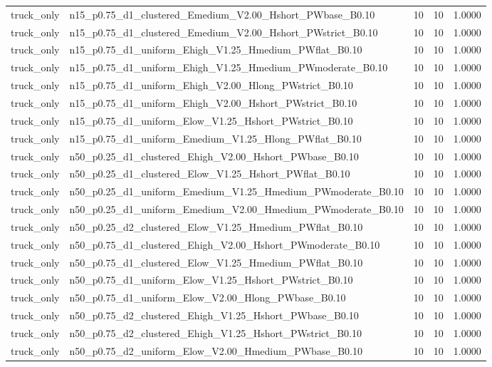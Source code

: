 \begin{tabular}{llrrr}
truck_only & n15_p0.75_d1_clustered_Emedium_V2.00_Hshort_PWbase_B0.10 & 10 & 10 & 1.0000 \\
truck_only & n15_p0.75_d1_clustered_Emedium_V2.00_Hshort_PWstrict_B0.10 & 10 & 10 & 1.0000 \\
truck_only & n15_p0.75_d1_uniform_Ehigh_V1.25_Hmedium_PWflat_B0.10 & 10 & 10 & 1.0000 \\
truck_only & n15_p0.75_d1_uniform_Ehigh_V1.25_Hmedium_PWmoderate_B0.10 & 10 & 10 & 1.0000 \\
truck_only & n15_p0.75_d1_uniform_Ehigh_V2.00_Hlong_PWstrict_B0.10 & 10 & 10 & 1.0000 \\
truck_only & n15_p0.75_d1_uniform_Ehigh_V2.00_Hshort_PWstrict_B0.10 & 10 & 10 & 1.0000 \\
truck_only & n15_p0.75_d1_uniform_Elow_V1.25_Hshort_PWstrict_B0.10 & 10 & 10 & 1.0000 \\
truck_only & n15_p0.75_d1_uniform_Emedium_V1.25_Hlong_PWflat_B0.10 & 10 & 10 & 1.0000 \\
truck_only & n50_p0.25_d1_clustered_Ehigh_V2.00_Hshort_PWbase_B0.10 & 10 & 10 & 1.0000 \\
truck_only & n50_p0.25_d1_clustered_Elow_V1.25_Hshort_PWflat_B0.10 & 10 & 10 & 1.0000 \\
truck_only & n50_p0.25_d1_uniform_Emedium_V1.25_Hmedium_PWmoderate_B0.10 & 10 & 10 & 1.0000 \\
truck_only & n50_p0.25_d1_uniform_Emedium_V2.00_Hmedium_PWmoderate_B0.10 & 10 & 10 & 1.0000 \\
truck_only & n50_p0.25_d2_clustered_Elow_V1.25_Hmedium_PWflat_B0.10 & 10 & 10 & 1.0000 \\
truck_only & n50_p0.75_d1_clustered_Ehigh_V2.00_Hshort_PWmoderate_B0.10 & 10 & 10 & 1.0000 \\
truck_only & n50_p0.75_d1_clustered_Elow_V1.25_Hmedium_PWflat_B0.10 & 10 & 10 & 1.0000 \\
truck_only & n50_p0.75_d1_uniform_Elow_V1.25_Hshort_PWstrict_B0.10 & 10 & 10 & 1.0000 \\
truck_only & n50_p0.75_d1_uniform_Elow_V2.00_Hlong_PWbase_B0.10 & 10 & 10 & 1.0000 \\
truck_only & n50_p0.75_d2_clustered_Ehigh_V1.25_Hshort_PWbase_B0.10 & 10 & 10 & 1.0000 \\
truck_only & n50_p0.75_d2_clustered_Ehigh_V1.25_Hshort_PWstrict_B0.10 & 10 & 10 & 1.0000 \\
truck_only & n50_p0.75_d2_uniform_Elow_V2.00_Hmedium_PWbase_B0.10 & 10 & 10 & 1.0000 \\
\bottomrule
\end{tabular}
